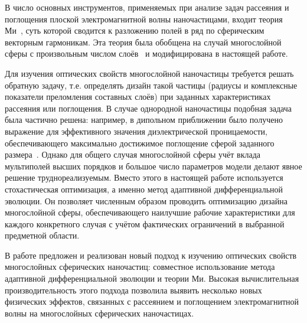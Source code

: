 {\methods} В число основных инструментов, применяемых при анализе задач
рассеяния и поглощения плоской электромагнитной волны наночастицами,
входит теория Ми~\cite{Mie-1908}, суть которой
сводится к разложению полей в ряд по сферическим векторным
гармоникам. Эта теория была обобщена на случай многослойной сферы с
произвольным числом слоёв~\cite{Yang-2003, Pena-scattnlay-2009} и
модифицирована в настоящей работе. %

Для изучения оптических свойств многослойной наночастицы требуется
решать обратную задачу, т.е. определять дизайн такой частицы
(радиусы и комплексные показатели преломления составных слоёв) при
заданных характеристиках рассеяния или поглощения. В случае однородной
наночастицы подобная задача была частично решена: например, в дипольном
приближении было получено выражение для эффективного значения
диэлектрической проницаемости, обеспечивающего максимально достижимое
поглощение сферой заданного
размера~\cite{Grigoriev-2015}. Однако для общего случая многослойной
сферы учёт вклада мультиполей высших порядков и большое число
параметров модели делают явное решение труднореализуемым. Вместо этого
в настоящей работе используется стохастическая оптимизация, а
именно метод адаптивной дифференциальной эволюции. Он позволяет
численным образом проводить оптимизацию дизайна многослойной сферы,
обеспечивающего наилучшие рабочие характеристики для каждого
конкретного случая с учётом фактических ограничений в выбранной
предметной области.

{\novelty} В работе предложен и реализован новый подход к изучению
оптических свойств многослойных сферических наночастиц: совместное
использование метода адаптивной дифференциальной эволюции и теории Ми.
Высокая вычислительная производительность этого подхода позволила
выявить несколько новых физических эффектов, связанных с рассеянием и
поглощением электромагнитной волны на многослойных сферических
наночастицах.

